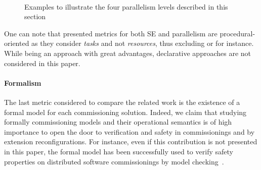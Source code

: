 \begin{figure*}[t!]
  \begin{center}
    \\

    \caption{Examples to illustrate the four parallelism levels
      described in this section}
    \label{fig:par}
  \end{center}
\end{figure*}


One can note that presented metrics for both SE and parallelism are
procedural-oriented as they consider \emph{tasks} and not
\emph{resources}, thus excluding \puppet or \salt for instance. While
being an approach with great advantages, declarative approaches are
not considered in this paper.

\paragraph{Formalism}
The last metric considered to compare the related work is the
existence of a formal model for each commissioning solution. Indeed,
we claim that studying formally commissioning models and their
operational semantics is of high importance to open the door to
verification and safety in commissionings and by extension
reconfigurations. For instance, even if this contribution is not
presented in this paper, the formal model \mad has been
successfully used to verify safety properties on distributed software
commissionings by model checking~\cite{coullon:hal-02323641}.

